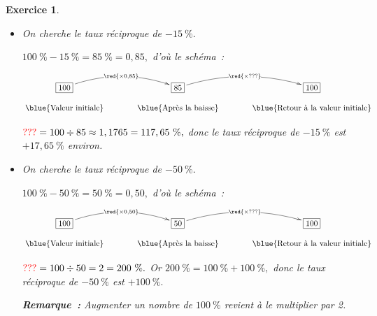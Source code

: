 \documentclass[10pt]{article}
\newtheorem{exo}{Exercice}
\begin{document}
\begin{exo}
\begin{enumerate}
\begin{itemize}
$\textcolor{red}{???}=100\div 160 =0,625=62,5~\%,$ et comme $100~\%-62,5~\%=37,5~\%,$ le taux réciproque de $+60~\%$ est $-37,5~\%.$
\item[\textbullet] On cherche le taux réciproque de $-15~\%.$

    \medskip


$100~\%-15~\%=85~\%=0,85,$ d'où le schéma~:

\begin{center}
    $\xymatrix@R=0.5pc@C=3pc{
    *+[F]+{100} \ar@/^0.5cm/[r]|{\red{\times 0,85}} & 
    *+[F]+{85} \ar@/^0.5cm/[r]|{\red{\times ???}} & *+[F]+{100} \\
    \txt{\blue{Valeur initiale}}&
    \txt{\blue{Après la baisse}}&\txt{\blue{Retour à la valeur initiale}}
    }$
    \end{center}
    
        \medskip

$\textcolor{red}{???}=100\div 85 \approx 1,1765=117,65~\%,$ donc le taux réciproque de $-15~\%$ est $+17,65~\%$ environ.
\item[\textbullet] On cherche le taux réciproque de $-50~\%.$


$100~\%-50~\%=50~\%=0,50,$ d'où le schéma~:

    \medskip


\begin{center}
    $\xymatrix@R=0.5pc@C=3pc{
    *+[F]+{100} \ar@/^0.5cm/[r]|{\red{\times 0,50}} & 
    *+[F]+{50} \ar@/^0.5cm/[r]|{\red{\times ???}} & *+[F]+{100} \\
    \txt{\blue{Valeur initiale}}&
    \txt{\blue{Après la baisse}}&\txt{\blue{Retour à la valeur initiale}}
    }$
    \end{center}
    
        \medskip

$\textcolor{red}{???}=100\div 50 =2=200~\%.$ Or $200~\%=100~\%+100~\%,$ donc le taux réciproque de $-50~\%$ est $+100~\%.$

\textbf{Remarque~:} Augmenter un nombre de $100~\%$ revient à le multiplier par 2.
\end{itemize}
\end{enumerate}


\end{exo}
\end{document}
